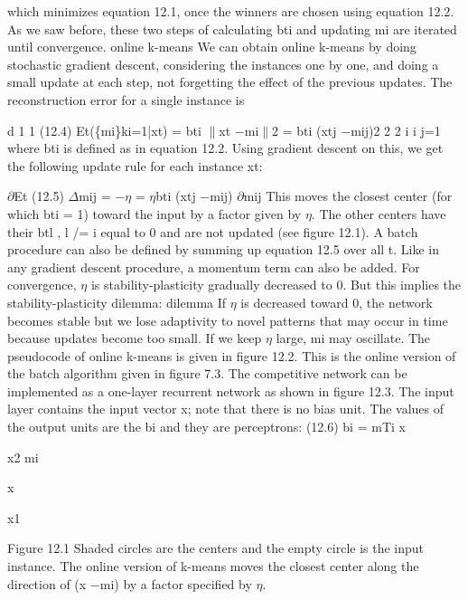 which minimizes equation 12.1, once the winners are chosen using equation 12.2. As we saw before, these two steps of calculating bti and updating mi are iterated until convergence. online k-means We can obtain online k-means by doing stochastic gradient descent, considering the instances one by one, and doing a small update at each step, not forgetting the effect of the previous updates. The reconstruction error for a single instance is

d 1 1 (12.4) Et(\{mi\}ki=1|xt) = bti $\parallel$xt $-$mi$\parallel$2 = bti (xtj $-$mij)2 2 2 i i j=1 where bti is defined as in equation 12.2. Using gradient descent on this, we get the following update rule for each instance xt:

$\partial$Et (12.5) $\Delta$mij = $-$$\eta$ = $\eta$bti (xtj $-$mij) $\partial$mij This moves the closest center (for which bti = 1) toward the input by a factor given by $\eta$. The other centers have their btl , l /= i equal to 0 and are not updated (see figure 12.1). A batch procedure can also be defined by summing up equation 12.5 over all t. Like in any gradient descent procedure, a momentum term can also be added. For convergence, $\eta$ is stability-plasticity gradually decreased to 0. But this implies the stability-plasticity dilemma: dilemma If $\eta$ is decreased toward 0, the network becomes stable but we lose adaptivity to novel patterns that may occur in time because updates become too small. If we keep $\eta$ large, mi may oscillate. The pseudocode of online k-means is given in figure 12.2. This is the online version of the batch algorithm given in figure 7.3. The competitive network can be implemented as a one-layer recurrent network as shown in figure 12.3. The input layer contains the input vector x; note that there is no bias unit. The values of the output units are the bi and they are perceptrons: (12.6) bi = mTi x

x2 mi

x

x1

Figure 12.1 Shaded circles are the centers and the empty circle is the input instance. The online version of k-means moves the closest center along the direction of (x $-$mi) by a factor specified by $\eta$.

